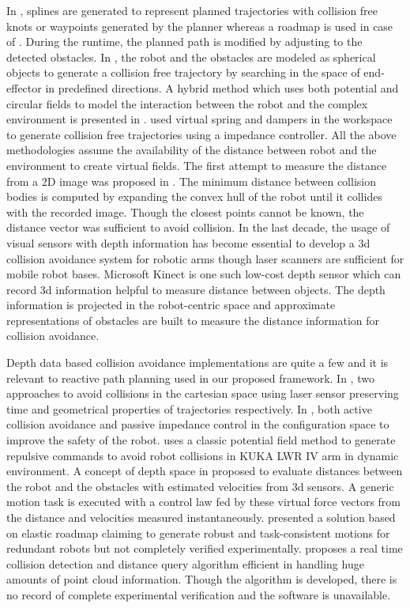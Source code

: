 In \cite{vannoy2008real}, splines are generated to represent planned trajectories with collision free knots or waypoints generated by the planner whereas a roadmap is used in case of \cite{yang2006elastic,brock2001decomposition}. During the runtime, the planned path is modified by adjusting to the detected obstacles. In \cite{balan2006real}, the robot and the obstacles are modeled as spherical objects to generate a collision free trajectory by searching in the space of end-effector in predefined directions. A hybrid method which uses both potential and circular fields to model the interaction between the robot and the complex environment is presented in \cite{haddadin2011dynamic}. \cite{haddadin2010real} used virtual spring and dampers in the workspace to generate collision free trajectories using a impedance controller. All the above methodologies assume the availability of the distance between robot and the environment to create virtual fields. The first attempt to measure the distance from a 2D image was proposed in \cite{kuhn2007fast}. The minimum distance between collision bodies is computed by   
expanding the convex hull of the robot until it collides with the recorded image. Though the closest points cannot be known, the distance vector was sufficient to avoid collision. In the last decade, the usage of visual sensors with depth information has become essential to develop a 3d collision avoidance system for robotic arms though laser scanners are sufficient for mobile robot bases. Microsoft Kinect is one such low-cost depth sensor which can record 3d information helpful to measure distance between objects. The depth information is projected in the robot-centric space and approximate representations of obstacles are built to measure the distance information for collision avoidance.

Depth data based collision avoidance implementations are quite a few and it is relevant to reactive path planning used in our proposed framework. In \cite{bascetta2010anti}, two approaches to avoid collisions in the cartesian space using laser sensor preserving time and geometrical properties of trajectories respectively. In \cite{schiavi2009integration}, both active collision avoidance and passive impedance control in the configuration space to improve the safety of the robot. \cite{Flacco2012} uses a classic potential field method to generate repulsive commands to avoid robot collisions in KUKA LWR IV arm in dynamic environment. A concept of depth space in proposed to evaluate distances between the robot and the obstacles with estimated velocities from 3d sensors. A generic motion task is executed with a control law fed by these virtual force vectors from the distance and velocities measured instantaneously. \cite{yang2010elastic} presented a solution based on elastic roadmap \cite{yang2006elastic} claiming to generate robust and task-consistent motions for redundant robots but not completely verified experimentally. \cite{pan2013real} proposes a real time collision detection and distance query algorithm efficient in handling huge amounts of point cloud information. Though the algorithm is developed, there is no record of complete experimental verification and the software is unavailable.

